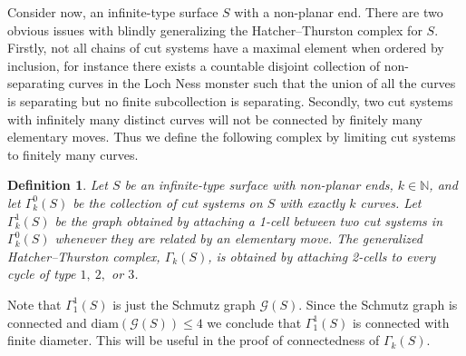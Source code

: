 \documentclass[11pt]{article}
\def\N{\mathbb{N}}
\newtheorem{definition}[theorem]{Definition}
\begin{document}
Consider now, an infinite-type surface $S$ with a non-planar end. There are two obvious issues with blindly generalizing the Hatcher--Thurston complex for $S$. Firstly, not all chains of cut systems have a maximal element when ordered by inclusion, for instance there exists a countable disjoint collection of non-separating curves in the Loch Ness monster such that the union of all the curves is separating but no finite subcollection is separating. Secondly, two cut systems with infinitely many distinct curves will not be connected by finitely many elementary moves. Thus we define the following complex by limiting cut systems to finitely many curves.
\begin{definition}
  Let $S$ be an infinite-type surface with non-planar ends, $k\in \N$, and let $\Gamma^0_k(S)$ be the collection of cut systems on $S$ with exactly $k$ curves. Let $\Gamma^1_k(S)$ be the graph obtained by attaching a 1-cell between two cut systems in $\Gamma^0_k(S)$ whenever they are related by an elementary move. The generalized Hatcher--Thurston complex, $\Gamma_k(S)$, is obtained by attaching 2-cells to every cycle of type $1,\ 2,$ or $3$.
\end{definition}
Note that $\Gamma^1_1(S)$ is just the Schmutz graph $ \mathcal{G}(S)$. Since the Schmutz graph is connected and $\text{diam}( \mathcal{G}(S))\leq 4$ we conclude that $\Gamma^1_1(S)$ is connected with finite diameter. This will be useful in the proof of connectedness of $\Gamma_k(S)$.
\end{document}
